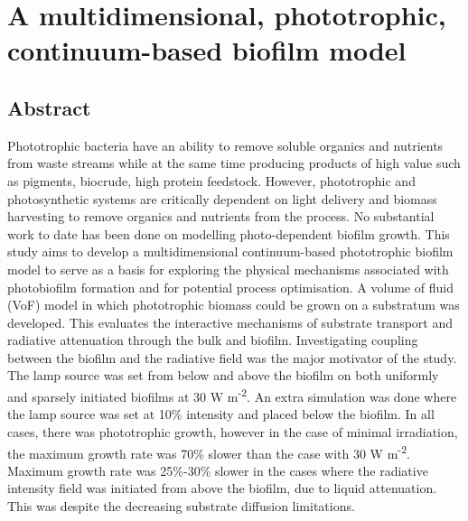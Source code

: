 \chapter[A multidimensional, phototrophic, continuum-based biofilm model]{A multidimensional, phototrophic, continuum-based biofilm model}
\label{chap:ch4}	%
\pagestyle{headings}

\section*{Abstract}
Phototrophic bacteria have an ability to remove soluble organics and nutrients from waste streams while at the same time producing products of high value such as pigments, biocrude, high protein feedstock. 
However, phototrophic and photosynthetic systems are critically dependent on light delivery and biomass harvesting to remove organics and nutrients from the process.
No substantial work to date has been done on modelling photo-dependent biofilm growth.
This study aims to develop a multidimensional continuum-based phototrophic biofilm model to serve as a basis for exploring the physical mechanisms associated with photobiofilm formation and for potential process optimisation. 
A volume of fluid (VoF) model in which phototrophic biomass could be grown on a substratum was developed. 
This evaluates the interactive mechanisms of substrate transport and radiative attenuation through the bulk and biofilm. 
Investigating coupling between the biofilm and the radiative field was the major motivator of the study. 
The lamp source was set from below and above the biofilm on both uniformly and sparsely initiated biofilms at 30 W m\textsuperscript{-2}. An extra simulation was done where the lamp source was set at 10\% intensity and placed below the biofilm. In all cases, there was phototrophic growth, however in the case of minimal irradiation, the maximum growth rate was 70\% slower than the case with 30 W m\textsuperscript{-2}. 
Maximum growth rate was 25\%-30\% slower in the cases where the radiative intensity field was initiated from above the biofilm, due to liquid attenuation. This was despite the decreasing substrate diffusion limitations. 

